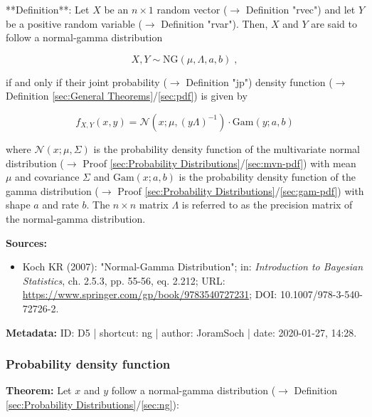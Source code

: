 \documentclass[a4paper,12pt]{book}
\begin{document}
**Definition**: Let $X$ be an $n \times 1$ random vector ($\rightarrow$ Definition "rvec") and let $Y$ be a positive random variable ($\rightarrow$ Definition "rvar"). Then, $X$ and $Y$ are said to follow a normal-gamma distribution

\begin{equation} \label{eq:ng-ng}
X,Y \sim \mathrm{NG}(\mu, \Lambda, a, b) \; ,
\end{equation}

if and only if their joint probability ($\rightarrow$ Definition "jp") density function ($\rightarrow$ Definition \ref{sec:General Theorems}/\ref{sec:pdf}) is given by

\begin{equation} \label{eq:ng-ng-pdf}
f_{X,Y}(x,y) = \mathcal{N}(x; \mu, (y \Lambda)^{-1}) \cdot \mathrm{Gam}(y; a, b)
\end{equation}

where $\mathcal{N}(x; \mu, \Sigma)$ is the probability density function of the multivariate normal distribution ($\rightarrow$ Proof \ref{sec:Probability Distributions}/\ref{sec:mvn-pdf}) with mean $\mu$ and covariance $\Sigma$ and $\mathrm{Gam}(x; a, b)$ is the probability density function of the gamma distribution ($\rightarrow$ Proof \ref{sec:Probability Distributions}/\ref{sec:gam-pdf}) with shape $a$ and rate $b$. The $n \times n$ matrix $\Lambda$ is referred to as the precision matrix of the normal-gamma distribution.

\vspace{1em}
\textbf{Sources:}
\begin{itemize}
\item Koch KR (2007): "Normal-Gamma Distribution"; in: \textit{Introduction to Bayesian Statistics}, ch. 2.5.3, pp. 55-56, eq. 2.212; URL: \url{https://www.springer.com/gp/book/9783540727231}; DOI: 10.1007/978-3-540-72726-2.
\end{itemize}


\vspace{1em}
\textbf{Metadata:} ID: D5 | shortcut: ng | author: JoramSoch | date: 2020-01-27, 14:28.


\subsubsection[\textbf{Probability density function}]{Probability density function} \label{sec:ng-pdf}

\vspace{1em}
\textbf{Theorem:} Let $x$ and $y$ follow a normal-gamma distribution ($\rightarrow$ Definition \ref{sec:Probability Distributions}/\ref{sec:ng}):
\end{document}

